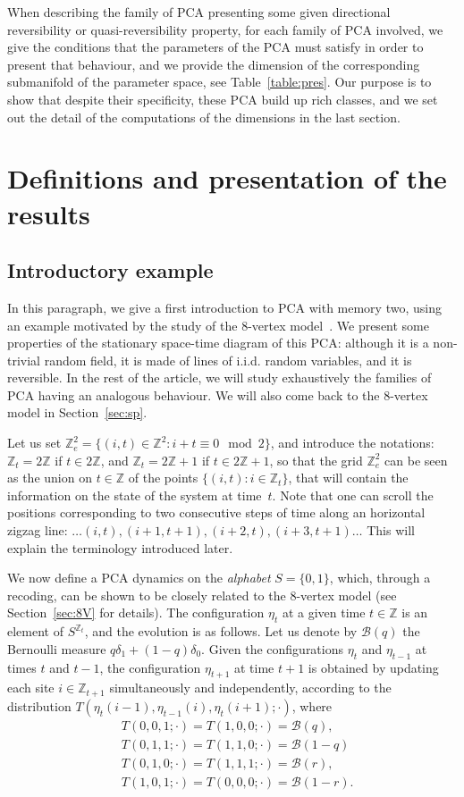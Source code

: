 \documentclass[AHL,Unicode,longabstracts]{cedram}
\newcounter{a}
\newcommand{\ZZ}{\mathbb{Z}}
\newcommand{\Z}{\mathbb{Z}}
\newcommand{\ber}{\mathcal{B}}
\begin{document}
When describing the family of PCA presenting some given directional reversibility or quasi-reversibility property, for each family of PCA involved, we give the conditions that the parameters of the PCA must satisfy in order to present that behaviour, and we provide the dimension of the corresponding submanifold of the parameter space, see Table~\ref{table:pres}. Our purpose is to show that despite their specificity, these PCA build up rich classes, and we set out the detail of the computations of the dimensions in the last section.

\section{Definitions and presentation of the results}\label{sec:introdef}

\subsection{Introductory example} \label{sec:introExample}

In this paragraph, we give a first introduction to PCA with memory two, using an example motivated by the study of the $8$-vertex model~\cite{Casse17}. We present some properties of the stationary space-time diagram of this PCA: although it is a non-trivial random field, it is made of lines of i.i.d. random variables, and it is reversible. In the rest of the article, we will study exhaustively the families of PCA having an analogous behaviour. We will also come back to the $8$-vertex model in Section~\ref{sec:sp}.

Let us set $\Z_{e}^2 = \{(i,t) \in \Z^2 : i+t \equiv 0 \mod 2\}$, and introduce the notations: $\Z_t=2\Z$ if $t\in 2\Z$, and $\Z_t=2\Z+1$ if $t\in 2\Z+1$, so that the grid $\Z_{e}^2$ can be seen as the union on $t\in\ZZ$ of the points $\{(i,t) : i\in\Z_t\}$, that will contain the information on the state of the system at time~$t$. Note that one can scroll the positions corresponding to two consecutive steps of time along an horizontal zigzag line: $\ldots(i,t), (i+1,t+1), (i+2,t), (i+3,t+1) \ldots $ This will explain the terminology introduced later.

We now define a PCA dynamics on the \emph{alphabet} $S=\{0,1\}$, which, through a recoding, can be shown to be closely related to the $8$-vertex model (see Section~\ref{sec:8V} for details). The configuration $\eta_t$ at a given time $t\in\Z$ is an element of $S^{\Z_t}$, and the evolution is as follows. Let us denote by $\ber(q)$ the Bernoulli measure $q\delta_1+(1-q)\delta_0$. Given the configurations $\eta_t$ and $\eta_{t-1}$ at times $t$ and $t-1$, the configuration $\eta_{t+1}$ at time $t+1$ is obtained by updating each site $i \in\Z_{t+1}$ simultaneously and independently, according to the distribution $T(\eta_t(i-1),\eta_{t-1}(i),\eta_{t}(i+1);\cdot)$, where
\begin{align*}
&T(0,0,1; \cdot)=T(1,0,0; \cdot)=\ber(q),\\
&T(0,1,1; \cdot)=T(1,1,0; \cdot)=\ber(1-q)\\
&T(0,1,0; \cdot)=T(1,1,1; \cdot)=\ber(r),\\
&T(1,0,1; \cdot)=T(0,0,0; \cdot)=\ber(1-r).
\end{align*}
\end{document}
